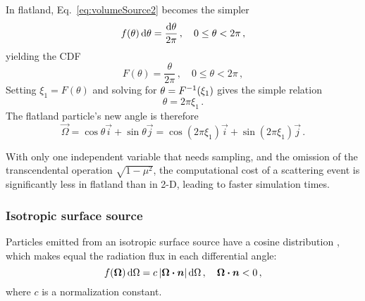 In flatland, Eq.~\eqref{eq:volumeSource2} becomes the simpler
\begin{equation*}
  f(\theta) \mathop{}\!\mathrm{d}\theta = \frac{\mathop{}\!\mathrm{d}\theta}{2\pi} \,,
  \quad 0 \le \theta < 2\pi\,,
\end{equation*}
yielding the CDF
\begin{equation}\label{eq:volumeSourceFlatland}
  F(\theta) = \frac{\theta}{2\pi}\,,
  \quad 0 \le \theta < 2\pi\,,
\end{equation}
Setting $\xi_1 = F(\theta)$ and solving for $\theta = F^{-1}(\xi_1)$ gives the
simple relation
\begin{equation*}
  \theta = 2\pi \xi_1\,.
\end{equation*}
The flatland particle's new angle is therefore
\begin{equation*}
  \vec{\Omega} = \cos \theta \vec{i} + \sin \theta \vec{j}
  = \cos(2\pi\xi_1) \vec{i} + \sin(2\pi\xi_1) \vec{j}\,.
\end{equation*}

With only one independent variable that needs sampling, and the omission of
the transcendental operation $\sqrt{1-\mu^2}$, the computational cost of a
scattering event is significantly less in flatland than in 2-D, leading to
faster simulation times.

\subsubsection{Isotropic surface source}\label{sec:isoSurface}
Particles emitted from an isotropic surface source have a cosine distribution
\cite{Gre2002}, which makes equal the radiation flux in each differential
angle:
\begin{equation}\label{eq:surfaceSource1}
  f(\bm{\Omega}) \mathop{}\!\mathrm{d} \Omega = c \left| \bm{\Omega}\bm{\cdot} \bm{n} \right| \mathop{}\!\mathrm{d} \Omega \,,
\quad \bm{\Omega}\bm{\cdot} \bm{n} < 0 \,,
\end{equation}
where $c$ is a normalization constant.

